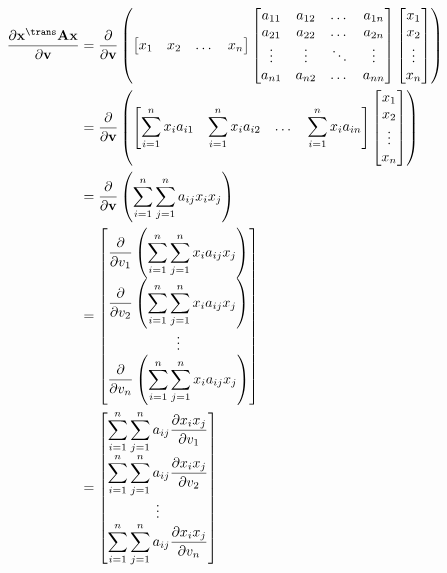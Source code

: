 \begin{align}
    \dfrac{\partial \mathbf{x}^\trans \mathbf{A} \mathbf{x}}{\partial \mathbf{v}} &= \dfrac{\partial}{\partial \mathbf{v}} \left(
    \begin{bmatrix}
        x_{1} & x_{2} & \dots & x_{n}
    \end{bmatrix}
    \begin{bmatrix}
        a_{11} & a_{12} & \dots & a_{1n} \\
        a_{21} & a_{22} & \dots & a_{2n} \\
        \vdots & \vdots & \ddots & \vdots \\
        a_{n1} & a_{n2} & \dots & a_{nn} \\
    \end{bmatrix} \begin{bmatrix}
        x_{1} \\ x_{2} \\ \vdots \\ x_{n}
    \end{bmatrix} \right) \\
    &= \dfrac{\partial}{\partial \mathbf{v}} \left(
			\begin{bmatrix}
				\displaystyle \sum_{i = 1}^{n} x_{i}a_{i1} & 
				\displaystyle \sum_{i = 1}^{n} x_{i}a_{i2} & 
				\dots & 
				\displaystyle \sum_{i = 1}^{n} x_{i}a_{in}
			\end{bmatrix} \begin{bmatrix}
				x_{1} \\ x_{2} \\ \vdots \\ x_{n}
			\end{bmatrix} \right) \\
            &= \dfrac{\partial}{\partial \mathbf{v}} \left(
				\sum_{i = 1}^{n}\sum_{j = 1}^{n} a_{ij} x_{i} x_{j}
			\right) \\
    &= \begin{bmatrix}
        \displaystyle \dfrac{\partial}{\partial v_1} \left( \sum_{i = 1}^{n}\sum_{j = 1}^{n} x_{i} a_{ij} x_{j} \right) \\ 
        \displaystyle  \dfrac{\partial}{\partial v_2} \left( \sum_{i = 1}^{n}\sum_{j = 1}^{n} x_{i} a_{ij} x_{j} \right) \\ 
        \vdots \\ 
        \displaystyle \dfrac{\partial}{\partial v_n} \left( \sum_{i = 1}^{n}\sum_{j = 1}^{n} x_{i} a_{ij} x_{j} \right) 
    \end{bmatrix} \\
    &= \begin{bmatrix}
        \displaystyle \sum_{i = 1}^{n}\sum_{j = 1}^{n} a_{ij} \dfrac{\partial x_{i}x_{j}}{\partial v_1} \\ 
        \displaystyle \sum_{i = 1}^{n}\sum_{j = 1}^{n} a_{ij} \dfrac{\partial x_{i}x_{j}}{\partial v_2} \\ 
        \vdots \\ 
        \displaystyle \sum_{i = 1}^{n}\sum_{j = 1}^{n} a_{ij} \dfrac{\partial x_{i}x_{j}}{\partial v_n} 
    \end{bmatrix}
\end{align}

